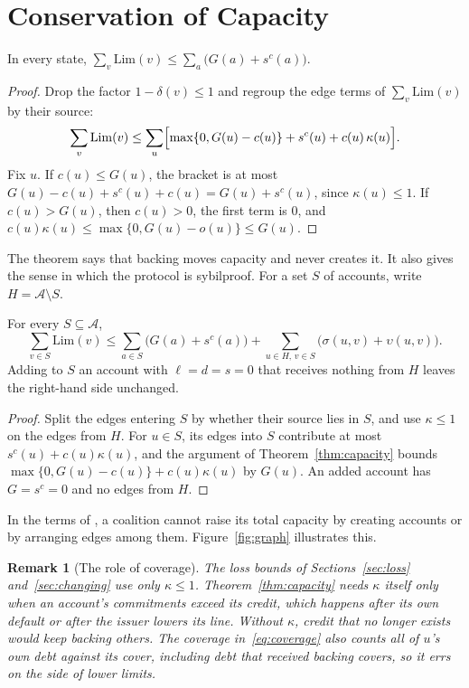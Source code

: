 \documentclass[acmsmall,nonacm,screen]{acmart}
\theoremstyle{acmdefinition}%
\newtheorem{remark}[theorem]{Remark}}
\newcommand{\A}{\mathcal{A}}
\newcommand{\Lim}{\mathrm{Lim}}
\begin{document}
\section{Conservation of Capacity}\label{sec:capacity}

\begin{theorem}[Capacity]\label{thm:capacity}
In every state, $\sum_{v}\Lim(v)\le\sum_{a}\bigl(G(a)+s^c(a)\bigr)$.
\end{theorem}

\begin{proof}
Drop the factor $1-\delta(v)\le1$ and regroup the edge terms of $\sum_v\Lim(v)$ by their source:
\[
  \sum_v\Lim(v)\le\sum_u\Bigl[\max\{0,G(u)-c(u)\}+s^c(u)+c(u)\,\kappa(u)\Bigr].
\]
Fix $u$. If $c(u)\le G(u)$, the bracket is at most $G(u)-c(u)+s^c(u)+c(u)=G(u)+s^c(u)$, since
$\kappa(u)\le1$. If $c(u)>G(u)$, then $c(u)>0$, the first term is $0$, and
$c(u)\kappa(u)\le\max\{0,G(u)-o(u)\}\le G(u)$.
\end{proof}

The theorem says that backing moves capacity and never creates it. It also gives the sense in
which the protocol is sybilproof. For a set $S$ of accounts, write $H=\A\setminus S$.

\begin{corollary}\label{cor:coalition-capacity}
For every $S\subseteq\A$,
\[
  \sum_{v\in S}\Lim(v)\le\sum_{a\in S}\bigl(G(a)+s^c(a)\bigr)+\sum_{u\in H,\,v\in S}\bigl(\sigma(u,v)+\upsilon(u,v)\bigr).
\]
Adding to $S$ an account with $\ell=d=s=0$ that receives nothing from $H$ leaves the right-hand
side unchanged.
\end{corollary}

\begin{proof}
Split the edges entering $S$ by whether their source lies in $S$, and use $\kappa\le1$ on the edges
from $H$. For $u\in S$, its edges into $S$ contribute at most $s^c(u)+c(u)\kappa(u)$, and the
argument of Theorem~\ref{thm:capacity} bounds $\max\{0,G(u)-c(u)\}+c(u)\kappa(u)$ by $G(u)$. An
added account has $G=s^c=0$ and no edges from $H$.
\end{proof}

In the terms of \citet{cheng2005sybilproof}, a coalition cannot raise its total capacity by creating
accounts or by arranging edges among them. Figure~\ref{fig:graph} illustrates this.

\begin{remark}[The role of coverage]\label{rem:coverage}
The loss bounds of Sections~\ref{sec:loss} and~\ref{sec:changing} use only $\kappa\le1$.
Theorem~\ref{thm:capacity} needs $\kappa$ itself only when an account's commitments exceed its
credit, which happens after its own default or after the issuer lowers its line. Without $\kappa$,
credit that no longer exists would keep backing others.
The coverage in~\eqref{eq:coverage} also counts all of $u$'s own debt against its cover, including
debt that received backing covers, so it errs on the side of lower limits.
\end{remark}
\end{document}
